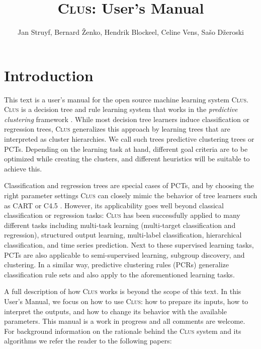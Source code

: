 \documentclass[a4paper]{report}
\newcommand{\clus}{\textsc{Clus}}
\begin{document}
\title{\clus: User's Manual}

\author{Jan Struyf, Bernard \v{Z}enko, Hendrik Blockeel, Celine Vens, Sa\v{s}o D\v{z}eroski}

\maketitle



\tableofcontents

%
\chapter{Introduction}

This text is a user's manual for the open source machine learning system \clus{}. \clus{} is a decision tree and rule learning system that works in the \emph{predictive clustering} framework \cite{Blockeel1998icml}.
While most decision tree learners induce classification or regression trees, \clus{} generalizes this approach by learning trees that are interpreted as cluster hierarchies. We call such trees predictive clustering trees or PCTs. Depending on the learning task at hand, different goal criteria are to be optimized while creating the clusters, and different heuristics will be suitable to achieve this.

Classification and regression trees are special cases of PCTs, and by choosing the right parameter settings \clus{} can closely mimic the behavior of tree learners such as CART \cite{Breiman1984} or C4.5 \cite{Quinlan1993}.  However, its applicability goes well beyond classical classification or regression tasks: \clus{} has been successfully applied to many different tasks including multi-task learning (multi-target classification and regression), structured output learning, multi-label classification, hierarchical classification, and time series prediction. Next to these supervised learning tasks, PCTs are also applicable to semi-supervised learning, subgroup discovery, and clustering.
%
In a similar way, predictive clustering rules (PCRs) generalize classification rule sets \cite{Clark91:proc} and also apply to the aforementioned learning tasks.

A full description of how \clus{} works is beyond the scope of this text. In this User's Manual, we focus on how to use \clus{}: how to prepare its inputs, how to interpret the outputs, and how to change its behavior with the available parameters. This manual is a work in progress and all comments are welcome.
%
For background information on the rationale behind the \clus{} system and its algorithms we refer the reader to the following papers:
\end{document}

